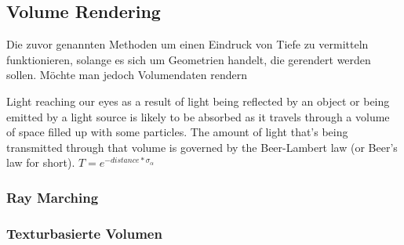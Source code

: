 \newpage
\subsection{Volume Rendering}

Die zuvor genannten Methoden um einen Eindruck von Tiefe zu vermitteln funktionieren, solange es sich um Geometrien handelt, 
die gerendert werden sollen. Möchte man jedoch Volumendaten rendern

Light reaching our eyes as a result of light being reflected by an object or being emitted by a light source 
is likely to be absorbed as it travels through a volume of space filled up with some particles.
The amount of light that's being transmitted through that volume is governed by the Beer-Lambert law (or Beer's law for short).
$T = e^{-distance *\sigma_\alpha}$



\subsubsection{Ray Marching}

\subsubsection{Texturbasierte Volumen}